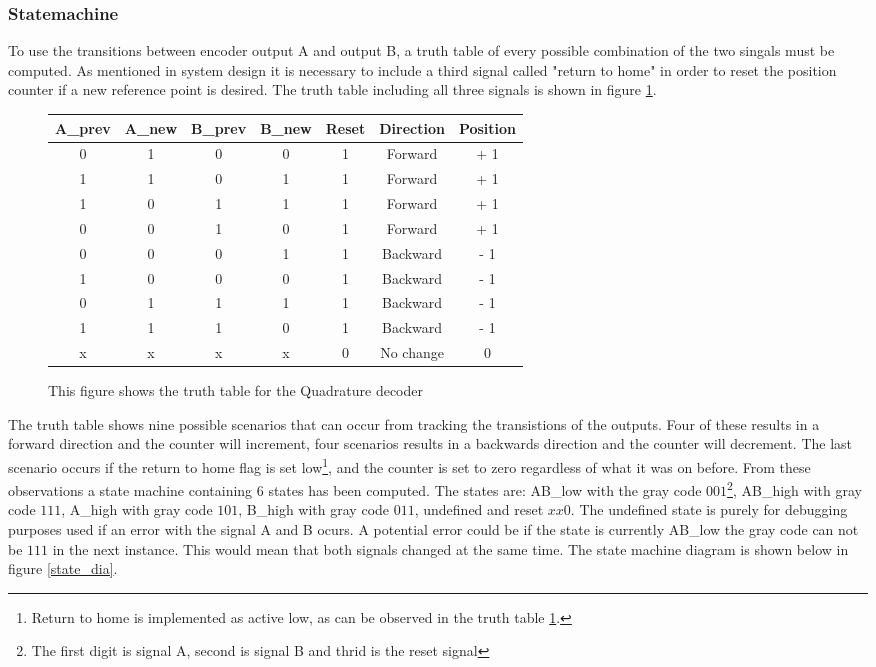 \documentclass[../../../main]{subfiles}
\begin{document}
\subsubsection{Statemachine}
To use the transitions between encoder output A and output B, a truth table of every possible combination of the two singals must be computed. As mentioned in system design it is necessary to include a third signal called "return to home" in order to reset the position counter if a new reference point is desired. The truth table including all three signals is shown in figure \ref{fig:truth_table}.
\begin{figure}[H]
  \begin{tabular}{|c | c | c | c | c | c |c|}
  \hline
   A\_prev & A\_new & B\_prev & B\_new & Reset & Direction & Position \\
   \hline
   0 & 1 & 0 & 0 & 1 & Forward & + 1 \\
   1 & 1 & 0 & 1 & 1 & Forward & + 1 \\
   1 & 0 & 1 & 1 & 1 & Forward & + 1 \\
   0 & 0 & 1 & 0 & 1 & Forward & + 1 \\
   0 & 0 & 0 & 1 & 1 & Backward & - 1 \\
   1 & 0 & 0 & 0 & 1 & Backward & - 1 \\
   0 & 1 & 1 & 1 & 1 & Backward & - 1 \\
   1 & 1 & 1 & 0 & 1 & Backward & - 1 \\
   x & x & x & x & 0 & No change &  0 \\
   \hline
  \end{tabular}
  \caption{This figure shows the truth table for the Quadrature decoder}
  \label{fig:truth_table}
\end{figure}
The truth table shows nine possible scenarios that can occur from tracking the transistions of the outputs. Four of these results in a forward direction and the counter will increment, four scenarios results in a backwards direction and the counter will decrement. The last scenario occurs if the return to home flag is set low\footnote{Return to home is implemented as active low, as can be observed in the truth table \ref{fig:truth_table}.}, and the counter is set to zero regardless of what it was on before. From these observations a state machine containing 6 states has been computed. The states are: AB\_low with the gray code $001$\footnote{The first digit is signal A, second is signal B and thrid is the reset signal}, AB\_high with gray code $111$, A\_high with gray code $101$, B\_high with gray code $011$, undefined and reset $xx0$. The undefined state is purely for debugging purposes used if an error with the signal A and B ocurs. A potential error could be if the state is currently AB\_low the gray code can not be $111$ in the next instance. This would mean that both signals changed at the same time. The state machine diagram is shown below in figure \ref{state_dia}. \\
\end{document}
